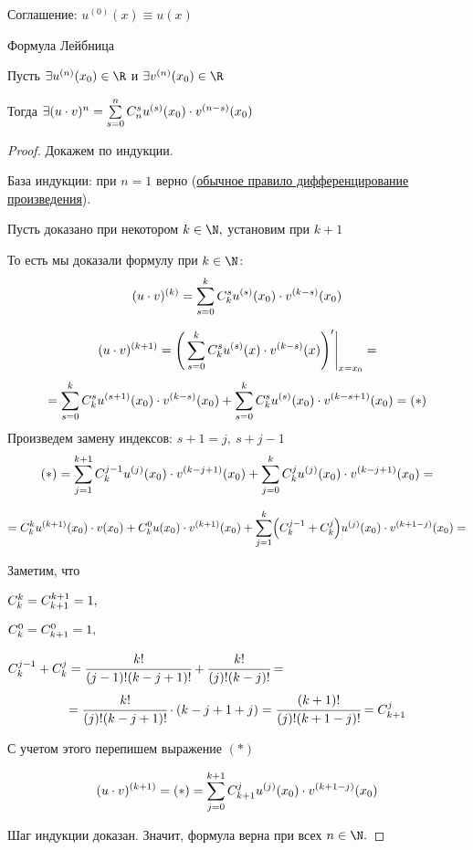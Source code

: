 Соглашение: $u^{(0)}(x) \equiv u(x)$

\begin{theorem} \hypertarget{thrm5.8}{Формула Лейбница}
	Пусть $\exists u^{(n)}(x_{0}) \in \R $ и $\exists v^{(n)}(x_{0}) \in \R$
	
	Тогда $\exists (u\cdot v)^{n} = \sum\limits_{s=0}^{n} \relax C_{n}^{s} u^{(s)}(x_{0}) \cdot v^{(n-s)}(x_{0})$
\end{theorem}
\begin{proof}
	Докажем по индукции.
	
	База индукции: при $n =1 $ верно (\hyperlink{thrm5.3}{обычное правило дифференцирование произведения}).
	
	Пусть доказано при некотором $k \in \N,$ установим при $k + 1$
	
	То есть мы доказали формулу при $k \in \N$:
	$$(u \cdot v)^{(k)} = \sum\limits_{s=0}^{k} \relax C_{k}^{s} u^{(s)}(x_{0}) \cdot v^{(k-s)}(x_{0}) $$
	
	$$
	(u \cdot v)^{(k+1)} = \Bigg(\sum\limits_{s=0}^{k} \relax C_{k}^{s} u^{(s)}(x) \cdot v^{(k-s)}(x) \Bigg)' \Bigg|_{x=x_{0}} = 
	$$
	$$ =\sum\limits_{s=0}^{k} \relax C_{k}^{s} u^{(s+1)}(x_{0}) \cdot v^{(k-s)}(x_{0}) + \sum\limits_{s=0}^{k} \relax C_{k}^{s} u^{(s)}(x_{0}) \cdot v^{(k-s + 1)}(x_{0}) = (*)
	$$
	Произведем замену индексов: $ s + 1 = j, \ s+ j - 1$
	$$
	(*) = \sum\limits_{j=1}^{k+1} \relax C_{k}^{j-1} u^{(j)}(x_{0}) \cdot v^{(k-j + 1)}(x_{0}) + \sum\limits_{j=0}^{k} \relax C_{k}^{j} u^{(j)}(x_{0}) \cdot v^{(k-j + 1)}(x_{0}) =
	$$
	
	$$
	=  \relax C_{k}^{k} u^{(k+1)}(x_{0}) \cdot v(x_{0}) + \relax C_{k}^{0} u(x_{0}) \cdot v^{(k+ 1)}(x_{0}) + \sum\limits_{j=1}^{k} \Bigl(\relax C_{k}^{j-1} + \relax C_{k}^{j} \Bigr) u^{(j)}(x_{0}) \cdot v^{(k+1 -j)}(x_{0}) = 
	$$
	
	Заметим, что
	
	$
	\relax C_{k}^{k} = \relax C_{k+1}^{k+1} = 1,$
	
	$\relax C_{k}^{0} = \relax C_{k + 1}^{0} = 1,
	$
	
	$
	\relax C_{k}^{j-1} +  \relax C_{k}^{j} = \cfrac{k!}{(j-1)!(k-j + 1)!} + \cfrac{k!}{(j)!(k-j)!} =
	$
	$$
	= \cfrac{k!}{(j)!(k-j+1)!} \cdot ( k -j + 1 + j) = \cfrac{(k+1)!}{(j)!(k+1-j)!} = C_{k+1}^{j}
	$$
	
	С учетом этого перепишем выражение $(*)$
	
	$$
	(u \cdot v)^{(k+1)} = (*) = \sum\limits_{j=0}^{k+1} \relax C_{k+1}^{j} u^{(j)}(x_{0}) \cdot v^{(k+1-j)}(x_{0})
	$$
	
	Шаг индукции доказан. Значит, формула верна при всех $n \in \N.$
\end{proof}

